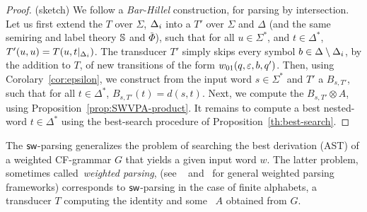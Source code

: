 \begin{proof} (sketch)
We follow a \emph{Bar-Hillel} construction, for parsing by intersection.
%
\noindent
Let us first extend the \SWT $T$ over $\Sigma$, $\Deltai$
into a \SWT $T'$ over $\Sigma$ and $\Delta$
(and the same semiring and label theory $\mathbb{S}$ and $\bar\Phi$),
such that for all $u \in \Sigma^*$, and $t \in {\Delta}^*$,
$T'(u, u) = T(u, t|_{\Deltai})$.
%
The transducer $T'$ simply skips every symbol
$b \in {\Delta} \setminus \Deltai$,
by the addition to $T$,
of new transitions of the form $\wei_{01}(q, \varepsilon, b, q')$.
%
\noindent
Then, using Corolary~\ref{cor:epsilon},
we construct from the input word $s \in \Sigma^*$ and $T'$
a \SWA $B_{s, T'}$,
such that for all $t \in \Delta^*$, $B_{s, T'}(t) = d(s, t)$.
%
%
\noindent
Next, %
we compute the \SWVPA $B_{s, T'} \otimes A$,
using Proposition~\ref{prop:SWVPA-product}.
%
\noindent
It remains to compute a best nested-word $t \in {\Delta}^*$
using the best-search procedure of Proposition~\ref{th:best-search}.
\end{proof}
The $\textsf{sw}$-parsing generalizes
the problem of searching the best derivation (AST) of a weighted CF-grammar $G$
that yields a given input word $w$.
The latter problem, sometimes called~\emph{weighted parsing},
(see \eg~\cite{Goodman99SemiringParsing}
 and~\cite{MorbitzVogler19weighted-parsing} for general weighted parsing frameworks)
corresponds to $\textsf{sw}$-parsing in the case of finite alphabets,
a transducer $T$ computing the identity and some \SWVPA~$A$
obtained from $G$. %
%
